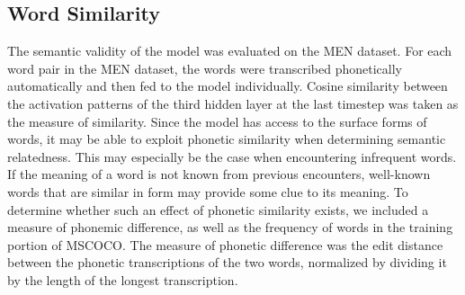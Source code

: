 \subsection{Word Similarity} %
The semantic validity of the model was evaluated on the MEN dataset. {} %
For each word pair in the MEN dataset, the words were transcribed phonetically automatically and then fed to the model individually. Cosine similarity between the activation patterns of the third hidden layer at the last timestep was taken as the measure of similarity. %
Since the model has access to the surface forms of words, it may be able to exploit phonetic similarity when determining semantic relatedness. This may especially be the case when encountering infrequent words. If the meaning of a word is not known from previous encounters, well-known words that are similar in form may provide some clue to its meaning. To determine whether such an effect of phonetic similarity exists, we included a measure of phonemic difference, as well as the frequency of words in the training portion of MSCOCO. The measure of phonetic difference was the edit distance between the phonetic transcriptions of the two words, normalized by dividing it by the length of the longest transcription.



